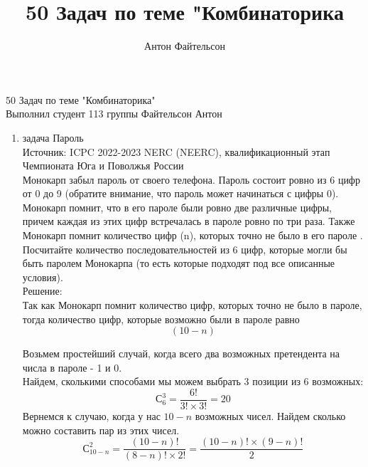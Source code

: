 \documentclass[a4paper,14pt]{extreport} %
\title{50 Задач по теме "Комбинаторика}
\author{Антон Файтельсон}
\date{}
\begin{document}
			\begin{flushleft}
				\Large 50 Задач по теме "Комбинаторика"		\\
				Выполнил студент 113 группы Файтельсон Антон
				
			\end{flushleft}
			\begin{center}
				\begin{enumerate}
					\item {\large задача  Пароль}\\
						Источник: ICPC 2022-2023 NERC (NEERC), квалификационный этап Чемпионата Юга и Поволжья России \\
						\vspace{15pt}
						Монокарп забыл пароль от своего телефона. Пароль состоит ровно из 6 цифр от 0 до 9 (обратите внимание, что пароль может начинаться с цифры 0).\\
						\vspace{15pt}
						Монокарп помнит, что в его пароле были ровно две различные цифры, причем каждая из этих цифр встречалась в пароле ровно по три раза. Также Монокарп помнит количество цифр (n), которых точно не было в его пароле . \\
						\vspace{15pt}
						Посчитайте количество последовательностей из 6 цифр, которые могли бы быть паролем Монокарпа (то есть которые подходят под все описанные условия).\\
						\vspace{15pt}
						{\large Решение:}\\
						Так как Монокарп помнит количество цифр, которых точно не было в пароле, тогда количество цифр, которые возможно были в пароле равно 
						\begin{equation}
							(10 - n )
						\end{equation}
						
						Возьмем простейший случай, когда всего два возможных претендента на числа в пароле - 1 и 0.\\
						Найдем, сколькими способами мы можем выбрать 3 позиции из 6 возможных:\\
						\begin{equation}
							С_6^3 = \frac{6!}{3!\times3!} = 20
						\end{equation}
						\newpage
						\vspace{15pt} 
						Вернемся к случаю, когда у нас \(10 - n\) возможных чисел. Найдем сколько можно составить пар из этих чисел.
						\begin{equation}
							С_{10-n}^2 = \frac{(10-n)!}{(8-n)!\times2!} = \frac{(10-n)!\times(9-n)!}{2}
						\end{equation}
						

\end{enumerate}
\end{center}
\end{document}

